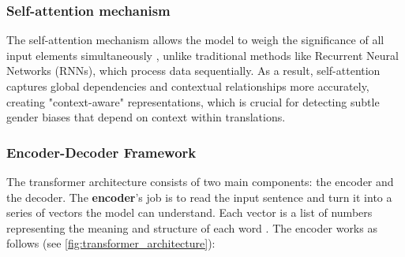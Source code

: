 \subsubsection{Self-attention mechanism}
The self-attention mechanism allows the model to weigh the significance of all input elements simultaneously \citep{xiaoIntroductionTransformersNLP2023}, unlike traditional methods like Recurrent Neural Networks (RNNs), which process data sequentially. As a result, self-attention captures global dependencies and contextual relationships more accurately, creating "context-aware" representations, which is crucial for detecting subtle gender biases that depend on context within translations.

\subsubsection{Encoder-Decoder Framework} \label{subsection:encoder-decoder}
The transformer architecture consists of two main components: the encoder and the decoder. The \textbf{encoder}’s job is to read the input sentence and turn it into a series of vectors the model can understand. Each vector is a list of numbers representing the meaning and structure of each word \citep{xiaoIntroductionTransformersNLP2023}. The encoder works as follows (see \autoref{fig:transformer_architecture}):

